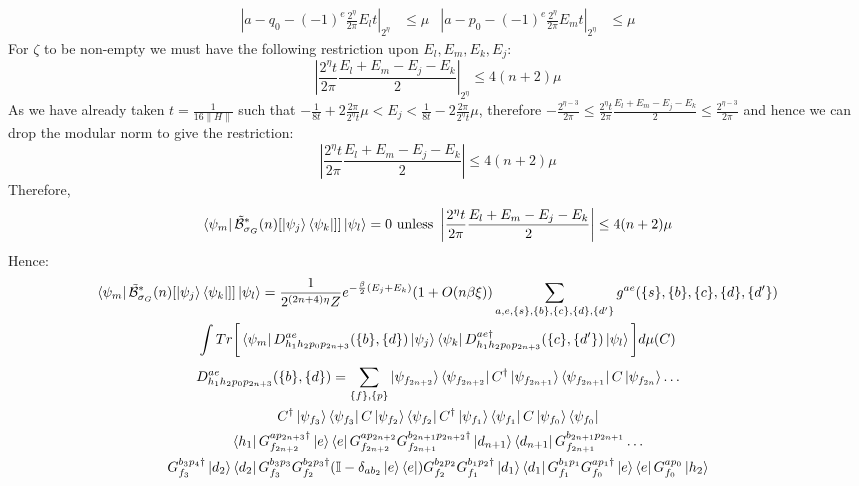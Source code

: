 \documentclass[aps,floatfix,10pt,amssymb,amsfont,amsmath,superscriptaddress,float,nofootinbib,longbibliography,nobalancelastpage,twocolumn]{revtex4-2}
\begin{document}
\begin{widetext}
\begin{equation}
\begin{aligned}
    |a-q_0-(-1)^{e}\frac{2^{\eta}}{2\pi}E_lt|_{2^{\eta}} &\leq \mu   &|a-p_0-(-1)^{e}\frac{2^{\eta}}{2\pi}E_mt|_{2^{\eta}}& \leq \mu
\end{aligned}
\end{equation}
For $\zeta$ to be non-empty we must have the following restriction upon $E_l,E_m,E_k, E_j$:
\begin{equation}
    \left|\frac{2^{\eta}t}{2\pi}\frac{E_l+E_m-E_j-E_k}{2}\right|_{2^{\eta}} \leq 4(n+2)\mu
\end{equation}
As we have already taken $t= \frac{1}{16\|H\|}$ such that $-\frac{1}{8t} + 2\frac{2\pi}{2^{\eta}t}\mu < E_j < \frac{1}{8t} - 2\frac{2\pi}{2^{\eta}t}\mu$, therefore $-\frac{2^{\eta-3}}{2\pi}\leq \frac{2^{\eta}t}{2\pi}\frac{E_l+E_m-E_j-E_k}{2} \leq \frac{2^{\eta-3}}{2\pi}$ and hence we can drop the modular norm to give the restriction:
\begin{equation}
\label{eq:energiessame}
    \left|\frac{2^{\eta}t}{2\pi}\frac{E_l+E_m-E_j-E_k}{2}\right| \leq 4(n+2)\mu
\end{equation}
Therefore,
\begin{equation}
    \bra{\psi_m}\tilde{\mathcal{B}}^*_{\sigma_G}(n)[\ket{\psi_j}\bra{\psi_k}]]\ket{\psi_l} = 0 \text{ unless } \left|\frac{2^{\eta}t}{2\pi}\frac{E_l+E_m-E_j-E_k}{2}\right| \leq 4(n+2)\mu
\end{equation}
Hence:
\begin{multline}
     \bra{\psi_m}\tilde{\mathcal{B}}^*_{\sigma_G}(n)[\ket{\psi_j}\bra{\psi_k}]]\ket{\psi_l} = \frac{1}{2^{(2n+4)\eta}Z}e^{-\frac{\beta}{2}(E_j+E_k)}(1+O(n\beta\xi))\sum_{a,e,\{s\},\{b\},\{c\},\{d\},\{d'\}} g^{ae}(\{s\},\{b\},\{c\},\{d\},\{d'\}) \\\int Tr\bigg[  \bra{\psi_{m}}D_{h_1h_2p_0p_{2n+3}}^{ae}(\{b\},\{d\})\ket{\psi_j}\bra{\psi_k} D_{h_1h_2p_0p_{2n+3}}^{ae\dagger}(\{c\},\{d'\})\ket{\psi_{l}}
  \bigg]d\mu(C) 
\end{multline}
\begin{multline}
    D^{ae}_{h_1h_2p_0p_{2n+3}}(\{b\},\{d\}) = \sum_{\{f\},\{p\}}\ket{\psi_{f_{2n+2}}}\bra{\psi_{f_{2n+2}}}C^{\dagger}\ket{\psi_{f_{2n+1}}}\bra{\psi_{f_{2n+1}}}C\ket{\psi_{f_{2n}}}\ldots \\C^{\dagger}\ket{\psi_{f_3}}\bra{\psi_{f_3}}C\ket{\psi_{f_2}}\bra{\psi_{f_2}}C^{\dagger}\ket{\psi_{f_1}}\bra{\psi_{f_1}}C\ket{\psi_{f_0}}\bra{\psi_{f_0}}
    \\
\bra{h_1}G^{ap_{2n+3}\dagger}_{f_{2n+2}}\ket{e}\bra{e}G^{ap_{2n+2}}_{f_{2n+2}}G^{b_{2n+1}p_{2n+2}\dagger}_{f_{2n+1}}\ket{d_{n+1}}\bra{d_{n+1}}G^{b_{2n+1}p_{2n+1}}_{f_{2n+1}}\ldots\\ G^{b_3p_4\dagger}_{f_3}\ket{d_2}\bra{d_2}G^{b_3p_3}_{f_3}G^{b_2p_3\dagger}_{f_2}(\mathbb{I} - \delta_{ab_2}\ket{e}\bra{e})G^{b_2p_2}_{f_2}G^{b_1p_2\dagger}_{f_1}\ket{d_1}\bra{d_1}G^{b_1p_1}_{f_1}G^{ap_1\dagger}_{f_0}\ket{e}\bra{e}G^{ap_0}_{f_0}\ket{h_2}

\end{multline}
\end{widetext}
\end{document}

